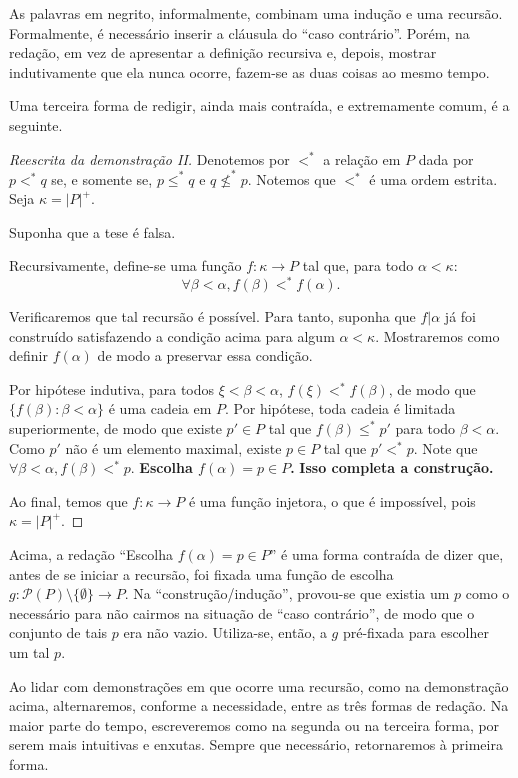 As palavras em negrito, informalmente, combinam uma indução e uma recursão.
Formalmente, é necessário inserir a cláusula do ``caso contrário''.
Porém, na redação, em vez de apresentar a definição recursiva e, depois, mostrar indutivamente que ela nunca ocorre, fazem-se as duas coisas ao mesmo tempo.

Uma terceira forma de redigir, ainda mais contraída, e extremamente comum, é a seguinte.

\begin{proof}[Reescrita da demonstração II]
    Denotemos por $<^*$ a relação em $P$ dada por $p<^* q$ se, e somente se, $p\leq^* q$ e $q\not\leq^* p$.
    Notemos que $<^*$ é uma ordem estrita.
    Seja $\kappa=|P|^+$.

    Suponha que a tese é falsa.
    
    Recursivamente, define-se uma função $f: \kappa\to P$ tal que, para todo $\alpha<\kappa$:
    \[
        \forall \beta<\alpha, f(\beta)<^* f(\alpha).
    \]

    Verificaremos que tal recursão é possível.
    Para tanto, suponha que $f|\alpha$ já foi construído satisfazendo a condição acima para algum $\alpha<\kappa$.
    Mostraremos como definir $f(\alpha)$ de modo a preservar essa condição.
    

    Por hipótese indutiva, para todos $\xi<\beta<\alpha$, $f(\xi)<^* f(\beta)$, de modo que $\{f(\beta): \beta<\alpha\}$ é uma cadeia em $P$.
    Por hipótese, toda cadeia é limitada superiormente, de modo que existe $p'\in P$ tal que $f(\beta)\leq^* p'$ para todo $\beta<\alpha$.
    Como $p'$ não é um elemento maximal, existe $p\in P$ tal que $p'<^* p$.
    Note que $\forall \beta<\alpha, f(\beta)<^* p$.
    \textbf{Escolha $f(\alpha)=p\in P$.}
    \textbf{Isso completa a construção.}

    Ao final, temos que $f:\kappa\to P$ é uma função injetora, o que é impossível, pois $\kappa=|P|^+$.
\end{proof}

Acima, a redação ``Escolha $f(\alpha)=p\in P$'' é uma forma contraída de dizer que, antes de se iniciar a recursão, foi fixada uma função de escolha $g:\mathcal P(P)\setminus\{\emptyset\}\to P$.
Na ``construção/indução'', provou-se que existia um $p$ como o necessário para não cairmos na situação de ``caso contrário'', de modo que o conjunto de tais $p$ era não vazio.
Utiliza-se, então, a $g$ pré-fixada para escolher um tal $p$.

Ao lidar com demonstrações em que ocorre uma recursão, como na demonstração acima, alternaremos, conforme a necessidade, entre as três formas de redação.
Na maior parte do tempo, escreveremos como na segunda ou na terceira forma, por serem mais intuitivas e enxutas.
Sempre que necessário, retornaremos à primeira forma.

